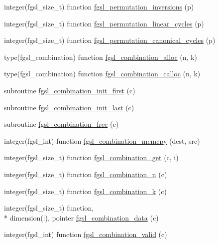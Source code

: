\begin{DoxyCompactItemize}
\item 
integer(fgsl\-\_\-size\-\_\-t) function \hyperlink{permutation_8finc_a85618d9acd677b30eca1256709554b17}{fgsl\-\_\-permutation\-\_\-inversions} (p)
\item 
integer(fgsl\-\_\-size\-\_\-t) function \hyperlink{permutation_8finc_a78568007bb7b73908f8307fa61483e3e}{fgsl\-\_\-permutation\-\_\-linear\-\_\-cycles} (p)
\item 
integer(fgsl\-\_\-size\-\_\-t) function \hyperlink{permutation_8finc_ad00f45e6a50f6b3fd1954fa3f09bcf91}{fgsl\-\_\-permutation\-\_\-canonical\-\_\-cycles} (p)
\item 
type(fgsl\-\_\-combination) function \hyperlink{permutation_8finc_ace565683aa9ef2635c53b2efe6afeee6}{fgsl\-\_\-combination\-\_\-alloc} (n, k)
\item 
type(fgsl\-\_\-combination) function \hyperlink{permutation_8finc_ab0fd8e6b594d8dbd95fb23f8e911f9c4}{fgsl\-\_\-combination\-\_\-calloc} (n, k)
\item 
subroutine \hyperlink{permutation_8finc_a3f234450ae639a2a5f1ee57b3e735dde}{fgsl\-\_\-combination\-\_\-init\-\_\-first} (c)
\item 
subroutine \hyperlink{permutation_8finc_a46a310ddadb5f2d35a7a6b3dd652c9cb}{fgsl\-\_\-combination\-\_\-init\-\_\-last} (c)
\item 
subroutine \hyperlink{permutation_8finc_a5621600a730419e48e135d3c165fd12d}{fgsl\-\_\-combination\-\_\-free} (c)
\item 
integer(fgsl\-\_\-int) function \hyperlink{permutation_8finc_a8c1ed815e15adea5c5eca5a54b74901d}{fgsl\-\_\-combination\-\_\-memcpy} (dest, src)
\item 
integer(fgsl\-\_\-size\-\_\-t) function \hyperlink{permutation_8finc_a1c9f6ecd2ddf2782907a5b1338553b62}{fgsl\-\_\-combination\-\_\-get} (c, i)
\item 
integer(fgsl\-\_\-size\-\_\-t) function \hyperlink{permutation_8finc_a999499c6e216c3cbf8c8eb2cc35efc8b}{fgsl\-\_\-combination\-\_\-n} (c)
\item 
integer(fgsl\-\_\-size\-\_\-t) function \hyperlink{permutation_8finc_ab7fad8757dc445fdd0b66b005d27e619}{fgsl\-\_\-combination\-\_\-k} (c)
\item 
integer(fgsl\-\_\-size\-\_\-t) function, \\*
dimension(\-:), pointer \hyperlink{permutation_8finc_af802fe7025690ec09c892e4a358e58ee}{fgsl\-\_\-combination\-\_\-data} (c)
\item 
integer(fgsl\-\_\-int) function \hyperlink{permutation_8finc_a32ca51968e7eaf13df7d34b23dd948b5}{fgsl\-\_\-combination\-\_\-valid} (c)

\end{DoxyCompactItemize}
